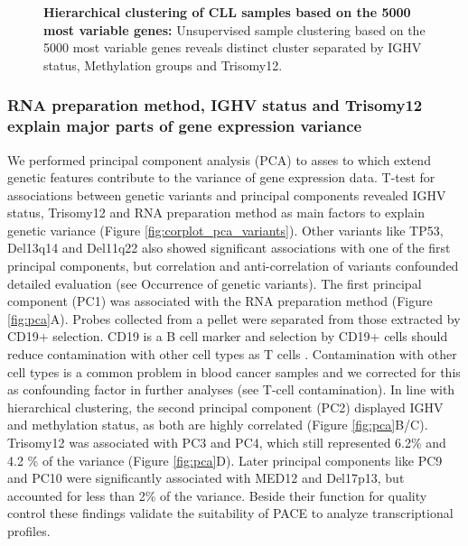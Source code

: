 \begin{figure}
	\centering
	\def\svgwidth{\columnwidth}
	
	\caption{\textbf{Hierarchical clustering of CLL samples based on the 5000 most variable genes:} Unsupervised sample clustering based on the 5000 most variable genes reveals distinct cluster separated by IGHV status, Methylation groups and Trisomy12.}
	\label{fig:cluster500exprGenes}
\end{figure}


\FloatBarrier

\subsubsection{RNA preparation method, IGHV status and Trisomy12 explain major parts of gene expression variance}

We performed principal component analysis (PCA) to asses to which extend genetic features contribute to the variance of gene expression data. T-test for associations between genetic variants and principal components revealed IGHV status, Trisomy12 and RNA preparation method as main factors to explain genetic variance (Figure \ref{fig:corplot_pca_variants}). Other variants like TP53, Del13q14 and Del11q22 also showed significant associations with one of the first principal components, but correlation and anti-correlation of variants confounded detailed evaluation (see Occurrence of genetic variants). The first principal component (PC1) was associated with the RNA preparation method (Figure \ref{fig:pca}A). Probes collected from a pellet were separated from those extracted by CD19+ selection. CD19 is a B cell marker and selection by CD19+ cells should reduce contamination with other cell types as T cells \citep{Abbasi-Kenarsari2015}. Contamination with other cell types is a common problem in blood cancer samples and we corrected for this as confounding factor in further analyses (see T-cell contamination). 
In line with hierarchical clustering, the second principal component (PC2) displayed IGHV and methylation status, as both are highly correlated (Figure \ref{fig:pca}B/C). Trisomy12 was associated with PC3 and PC4, which still represented 6.2\% and 4.2 \% of the variance (Figure \ref{fig:pca}D). Later principal components like PC9 and PC10 were significantly associated with MED12 and Del17p13, but accounted for less than 2\% of the variance.
Beside their function for quality control these findings validate the suitability of PACE to analyze transcriptional profiles.  

